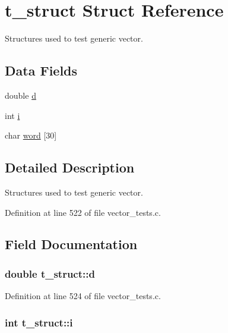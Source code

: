 \hypertarget{structt__struct}{
\section{t\_\-struct Struct Reference}
\label{structt__struct}
}


Structures used to test generic vector.  


\subsection*{Data Fields}
\begin{DoxyCompactItemize}
\item 
double \hyperlink{structt__struct_a2029e2f2da88d23bcc9fa6ba45f51bf4}{d}
\item 
int \hyperlink{structt__struct_a488184c86cae0be164cfb634882b8f7a}{i}
\item 
char \hyperlink{structt__struct_ab5b290b572fc4036f1e5efc671098c7f}{word} \mbox{[}30\mbox{]}
\end{DoxyCompactItemize}


\subsection{Detailed Description}
Structures used to test generic vector. 

Definition at line 522 of file vector\_\-tests.c.



\subsection{Field Documentation}
\hypertarget{structt__struct_a2029e2f2da88d23bcc9fa6ba45f51bf4}{
\subsubsection[{d}]{\setlength{\rightskip}{0pt plus 5cm}double {\bf t\_\-struct::d}}}
\label{structt__struct_a2029e2f2da88d23bcc9fa6ba45f51bf4}


Definition at line 524 of file vector\_\-tests.c.

\hypertarget{structt__struct_a488184c86cae0be164cfb634882b8f7a}{
\subsubsection[{i}]{\setlength{\rightskip}{0pt plus 5cm}int {\bf t\_\-struct::i}}}
\label{structt__struct_a488184c86cae0be164cfb634882b8f7a}


